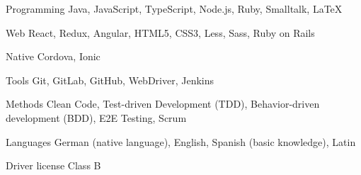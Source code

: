 

\begin{cvskills}

  \cvskill
    {Programming} %
    {Java, JavaScript, TypeScript, Node.js, Ruby, Smalltalk, \LaTeX} %

  \cvskill
    {Web} %
    {React, Redux, Angular, HTML5, CSS3, Less, Sass, Ruby on Rails} %

  \cvskill
    {Native} %
    {Cordova, Ionic} %

  \cvskill
    {Tools} %
    {Git, GitLab, GitHub, WebDriver, Jenkins} %

  \cvskill
    {Methods} %
    {Clean Code, Test-driven Development (TDD), Behavior-driven development (BDD), E2E Testing, Scrum} %

  \cvskill
    {Languages} %
    {German (native language), English, Spanish (basic knowledge), Latin} %

  \cvskill
    {Driver license} %
    {Class B} %

\end{cvskills}

